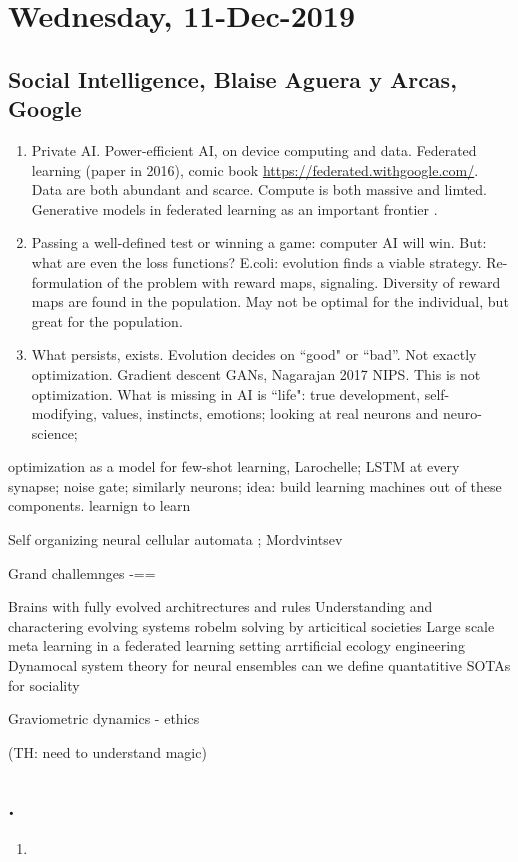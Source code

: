 \documentclass[12pt,a4paper]{article}
\begin{document}
\section{Wednesday, 11-Dec-2019}

\subsection{Social Intelligence, Blaise Aguera y Arcas, Google}

\begin{enumerate}
\item Private AI. Power-efficient AI, on device computing and data. Federated learning (paper in 2016), comic book \url{https://federated.withgoogle.com/}. Data are both abundant and scarce. Compute is both massive and limted. Generative models in federated learning as an important frontier \cite{augenstein2019generative}.
\item Passing a well-defined test or winning a game: computer AI will win. But: what are even the loss functions? E.coli: evolution finds a viable strategy. Re-formulation of the problem with reward maps, signaling. Diversity of reward maps are found in the population. May not be optimal for the individual, but great for the population. 
\item What persists, exists. Evolution decides on ``good" or ``bad''. Not exactly optimization. Gradient descent GANs, Nagarajan 2017 NIPS. This is not optimization. What is missing in AI is ``life": true development, self-modifying, values, instincts, emotions; looking at real neurons and neuro-science; 
\end{enumerate}
optimization as a model for few-shot learning, Larochelle; LSTM at every synapse; noise gate;  similarly neurons; idea: build learning machines out of these components. learnign to learn 

Self organizing neural cellular automata ; Mordvintsev


Grand challemnges 
-==

Brains with fully evolved architrectures and rules 
Understanding and charactering evolving systems 
robelm solving by articitical societies 
Large scale meta learning in a federated learning setting
arrtificial ecology engineering
Dynamocal system theory for neural ensembles
can we define quantatitive SOTAs for sociality 

Graviometric dynamics - ethics 


(TH: need to understand magic)
	



\subsection{
.
}
\begin{enumerate}
\item 
\end{enumerate}




\end{document}
